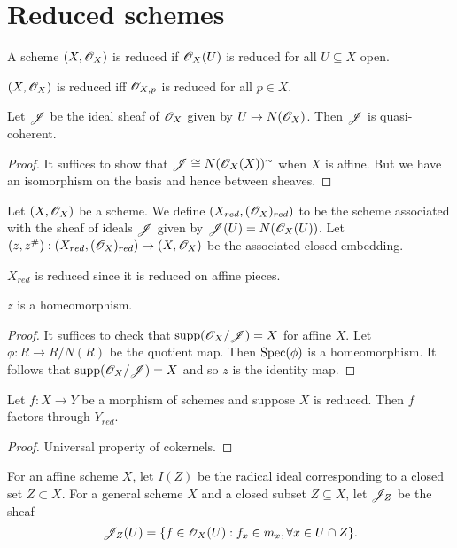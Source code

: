 \documentclass{memoir}
\begin{document}
\section{Reduced schemes}
\begin{definition}
    A scheme $(X,\mathscr{O}_X)$ is reduced if $\mathscr{O}_X(U)$ is reduced for all $U\subseteq X$ open.
\end{definition}
\begin{lemma}
    $(X,\mathscr{O}_X)$ is reduced iff $\mathscr{O}_{X,p}$ is reduced for all $p\in X$.
\end{lemma}
\begin{lemma}
    Let $\mathscr{J}$ be the ideal sheaf of $\mathscr{O}_X$ given by $U\mapsto N(\mathscr{O}_X)$.
    Then $\mathscr{J}$ is quasi-coherent.
\end{lemma}
\begin{proof}
    It suffices to show that $\mathscr{J}\cong N(\mathscr{O}_X(X))^\sim$ when $X$ is affine.
    But we have an isomorphism on the basis and hence between sheaves.
\end{proof}
\begin{definition}
    Let $(X,\mathscr{O}_X)$ be a scheme. 
    We define $(X_{red},(\mathscr{O}_X)_{red})$ to be the scheme associated with the sheaf of ideals $\mathscr{J}$ given by $\mathscr{J}(U) = N(\mathscr{O}_X(U))$.
    Let $(z,z^\#):(X_{red},(\mathscr{O}_X)_{red})\to (X,\mathscr{O}_X)$ be the associated closed embedding.
\end{definition}
\begin{remark}
    $X_{red}$ is reduced since it is reduced on affine pieces.
\end{remark}
\begin{proposition}
    $z$ is a homeomorphism.
\end{proposition}
\begin{proof}
    It suffices to check that $\text{supp}(\mathscr{O}_X/\mathscr{J}) = X$ for affine $X$.
    Let $\phi:R\to R/N(R)$ be the quotient map. Then $\operatorname{Spec}(\phi)$ is a homeomorphism.
    It follows that $\text{supp}(\mathscr{O}_X/\mathscr{J}) = X$ and so $z$ is the identity map.
\end{proof}
\begin{thm}
    Let $f:X\to Y$ be a morphism of schemes and suppose $X$ is reduced.
    Then $f$ factors through $Y_{red}$.
\end{thm}
\begin{proof}
    Universal property of cokernels.
\end{proof}
\begin{definition}
    For an affine scheme $X$, let $I(Z)$ be the radical ideal corresponding to a closed set $Z\subset X$.
    For a general scheme $X$ and a closed subset $Z\subseteq X$, let $\mathscr{J}_Z$ be the sheaf
    \begin{equation}
        \mathscr{J}_Z(U) = \{f\in \mathscr{O}_X(U) : f_x\in m_x, \forall x\in U\cap Z\}.
    \end{equation}
\end{definition}
\end{document}
